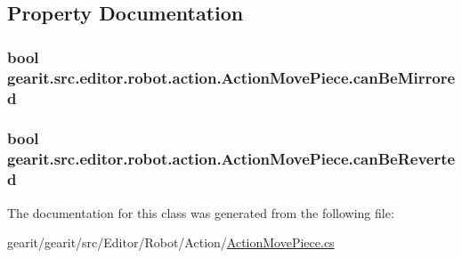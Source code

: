 \subsection{Property Documentation}
\hypertarget{classgearit_1_1src_1_1editor_1_1robot_1_1action_1_1_action_move_piece_a971e9bd950f22587c65ceb770591c476}{
\subsubsection[{can\+Be\+Mirrored}]{\setlength{\rightskip}{0pt plus 5cm}bool gearit.\+src.\+editor.\+robot.\+action.\+Action\+Move\+Piece.\+can\+Be\+Mirrored\hspace{0.3cm}{\ttfamily [get]}}}\label{classgearit_1_1src_1_1editor_1_1robot_1_1action_1_1_action_move_piece_a971e9bd950f22587c65ceb770591c476}
\hypertarget{classgearit_1_1src_1_1editor_1_1robot_1_1action_1_1_action_move_piece_a743f64497031e84eb8e08ca16094b71a}{
\subsubsection[{can\+Be\+Reverted}]{\setlength{\rightskip}{0pt plus 5cm}bool gearit.\+src.\+editor.\+robot.\+action.\+Action\+Move\+Piece.\+can\+Be\+Reverted\hspace{0.3cm}{\ttfamily [get]}}}\label{classgearit_1_1src_1_1editor_1_1robot_1_1action_1_1_action_move_piece_a743f64497031e84eb8e08ca16094b71a}


The documentation for this class was generated from the following file\+:\begin{DoxyCompactItemize}
\item 
gearit/gearit/src/\+Editor/\+Robot/\+Action/\hyperlink{_action_move_piece_8cs}{Action\+Move\+Piece.\+cs}\end{DoxyCompactItemize}
